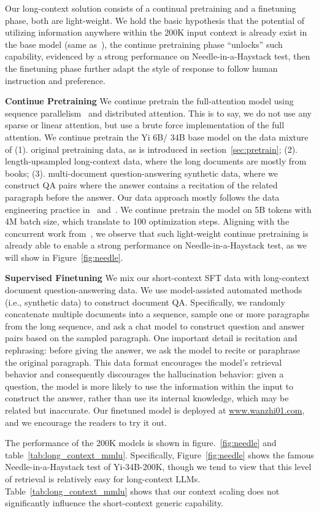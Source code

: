 Our long-context solution consists of a continual pretraining and a finetuning phase, both are light-weight.
We hold the basic hypothesis that the potential of utilizing information anywhere within the 200K input context is already 
exist in the base model (same as~\citealt{fu2024data}), the continue pretraining phase ``unlocks'' such capability, evidenced by a strong performance on Needle-in-a-Haystack test, then the finetuning phase further adapt the style of response to follow human instruction and preference. 

\textbf{Continue Pretraining}\quad
We continue pretrain the full-attention model using sequence parallelism~\citep{li2021sequence} and distributed attention.
This is to say, we do not use any sparse or linear attention, but use a brute force implementation of the full attention.
We continue pretrain the Yi 6B/ 34B base model on the data mixture of 
(1). original pretraining data, as is introduced in section~\ref{sec:pretrain}; 
(2). length-upsampled long-context data, where the long documents are mostly from books; 
(3). multi-document question-answering synthetic data, where we construct QA pairs where the answer contains a recitation of the related paragraph before the answer. 
Our data approach mostly follows the data engineering practice in~\citet{fu2024data} and~\citet{yu2023paraphrasing}. 
We continue pretrain the model on 5B tokens with 4M batch size, which translate to 100 optimization steps.
Aligning with the concurrent work from~\citet{fu2024data}, we observe that such light-weight continue pretraining is already able to enable a strong performance on Needle-in-a-Haystack test, as we will show in Figure~\ref{fig:needle}. 

\textbf{Supervised Finetuning}\quad
We mix our short-context SFT data with long-context document question-answering data. 
We use model-assisted automated methods (i.e., synthetic data) to construct document QA.
Specifically, we randomly concatenate multiple documents into a sequence, sample one or more paragraphs from the long sequence, and ask a chat model to construct question and answer pairs based on the sampled paragraph.
One important detail is recitation and rephrasing: before giving the answer, we ask the model to recite or paraphrase the original paragraph. 
This data format encourages the model's retrieval behavior and consequently discourages the hallucination behavior: given a question, the model is more likely to use the information within the input to construct the answer, rather than use its internal knowledge, which may be related but inaccurate. 
Our finetuned model is deployed at \url{www.wanzhi01.com}, and we encourage the readers to try it out. 



The performance of the 200K models is shown in figure.~\ref{fig:needle} and table~\ref{tab:long_context_mmlu}. 
Specifically, Figure~\ref{fig:needle} shows the famous Needle-in-a-Haystack test of Yi-34B-200K, though we tend to view that this level of retrieval is relatively easy for long-context LLMs. 
Table~\ref{tab:long_context_mmlu} shows that our context scaling does not significantly influence the short-context generic capability. 

